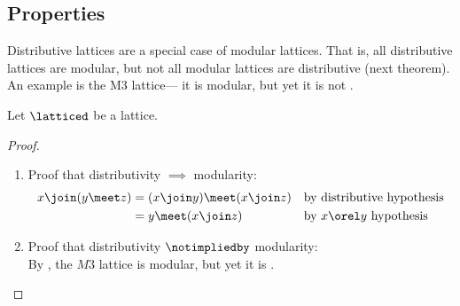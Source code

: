 \subsection{Properties}
Distributive lattices are a special case of modular lattices.
That is, all distributive lattices are modular, but not all
modular lattices are distributive (next theorem).
An example is the M3 lattice---
it is modular, but yet it is not  .
\begin{theorem}
\label{thm:lat_dis=>mod}
Let $\latticed$ be a lattice.
\end{theorem}
\begin{proof}
\begin{enumerate}
  \item Proof that distributivity $\implies$ modularity:
    \begin{align*}
      x \join (y\meet z)
        &= (x\join y) \meet (x\join z)
        && \text{by distributive hypothesis}
      \\&= y \meet (x\join z)
        && \text{by $x\orel y$ hypothesis}
    \end{align*}

  \item Proof that distributivity $\notimpliedby$ modularity: \\
    By , the $M3$ lattice is modular, but yet it is .
\end{enumerate}
\end{proof}

